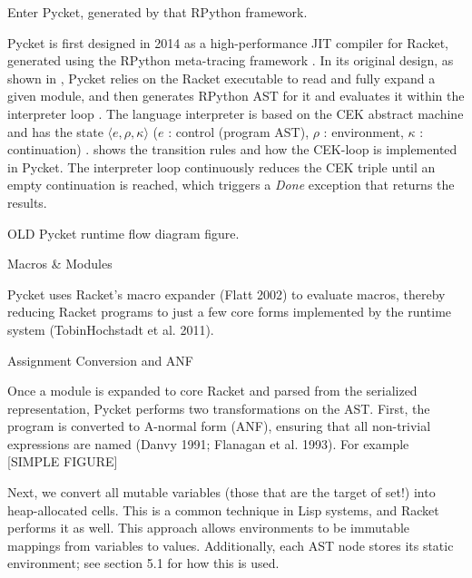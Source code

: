         \begin{paragraph-here}
            Enter Pycket, generated by that RPython framework.

            Pycket is first designed in 2014 as a high-performance JIT compiler
            for Racket, generated using the RPython meta-tracing framework
            \cite{bolz14-racket}. In its original design, as shown in
            , Pycket relies on the Racket executable to
            read and fully expand a given module\cite{samth:11}, and then
            generates RPython AST for it and evaluates it within the interpreter
            loop \cite{pycket15}. The language interpreter is based on the CEK
            abstract machine and has the state $\langle e, \rho, \kappa \rangle$ ($e$ : control
            (program AST), $\rho$ : environment, $\kappa$ : continuation)
            \cite{felleisen87}.  shows the transition rules and
            how the CEK-loop is implemented in Pycket. The interpreter loop
            continuously reduces the CEK triple until an empty continuation is
            reached, which triggers a \emph{Done} exception that returns the
            results.
        \end{paragraph-here}

        \begin{figure-here}
            OLD Pycket runtime flow diagram figure.
        \end{figure-here}

        Macros \& Modules

        Pycket uses Racket’s macro expander (Flatt 2002) to evaluate macros, thereby reducing Racket programs to just a few core forms implemented by the runtime system (TobinHochstadt et al. 2011).

        Assignment Conversion and ANF

        Once a module is expanded to core Racket and parsed from the serialized representation, Pycket performs two transformations on the AST. First, the program is converted to A-normal form (ANF), ensuring that all non-trivial expressions are named (Danvy 1991; Flanagan et al. 1993). For example [SIMPLE FIGURE]

        Next, we convert all mutable variables (those that are the target of set!) into heap-allocated cells. This is a common technique in Lisp systems, and Racket performs it as well. This approach allows environments to be immutable mappings from variables to values. Additionally, each AST node stores its static environment; see section 5.1 for how this is used.

